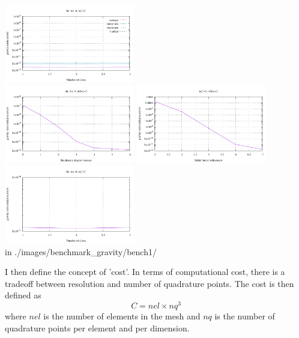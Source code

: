 \begin{center}
\includegraphics[width=5.7cm]{./images/benchmark_gravity/bench1/grav_nslice_error}\\
\includegraphics[width=5.7cm]{./images/benchmark_gravity/bench1/grav_nqplus_relerror}
\includegraphics[width=5.7cm]{./images/benchmark_gravity/bench1/grav_latres_relerror}
\includegraphics[width=5.7cm]{./images/benchmark_gravity/bench1/grav_nslice_relerror}\\
{\tiny {\color{gray} in ./images/benchmark\_gravity/bench1/}}
\end{center}

I then define the concept of 'cost'. In terms of computational cost, there is a tradeoff between resolution and 
number of quadrature points. The cost is then defined as 
\[
C = nel \times nq^3
\]
where $nel$ is the number of elements in the mesh and $nq$ is the number of quadrature points per element
and per dimension.


